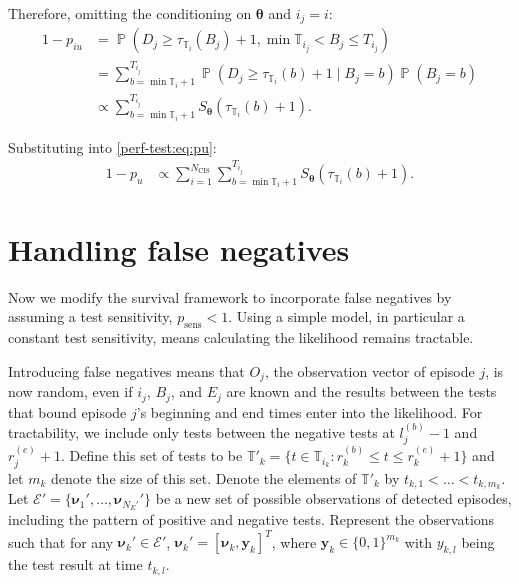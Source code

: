 \documentclass[12pt]{article}
\DeclareMathOperator{\prob}{\mathbb{P}}
\newcommand\set{\mathcal}
\renewcommand{\vec}[1]{\bm{#1}}
\newcommand{\ssep}{:}
\newcommand{\psens}{p_\text{sens}}
\newcommand{\Ncis}{N_\text{CIS}}
\newcommand{\sched}{\mathbb{T}}
\begin{document}
Therefore, omitting the conditioning on $\vec{\theta}$ and $i_j = i$:
\begin{align}
1 - p_{iu}
&= \prob(D_j \geq \tau_{\sched_{i}}(B_j)+ 1, \min \sched_{i_j} < B_j \leq T_{i_j}) \\
&= \sum_{b = \min \sched_{i} + 1}^{T_{i_j}} \prob(D_j \geq \tau_{\sched_{i}}(b) + 1 \mid B_j = b) \prob(B_j = b)\\
&\propto \sum_{b = \min \sched_{i} + 1}^{T_{i_j}} S_{\vec{\theta}}(\tau_{\sched_{i}}(b) + 1).
\label{perf-test:eq:piu}
\end{align}

Substituting into \cref{perf-test:eq:pu}:
\begin{align}
1 - p_u
& \propto \sum_{i=1}^{\Ncis} \sum_{b = \min \sched_{i} + 1}^{T_{i_j}} S_{\vec{\theta}}(\tau_{\sched_{i}}(b) + 1).
\end{align}

\section{Handling false negatives} \label{sec:false-negatives}

Now we modify the survival framework to incorporate false negatives by assuming a test sensitivity, $\psens < 1$.
Using a simple model, in particular a constant test sensitivity, means calculating the likelihood remains tractable.

Introducing false negatives means that $O_j$, the observation vector of episode $j$, is now random, even if $i_j$, $B_j$, and $E_j$ are known and the results between the tests that bound episode $j$'s beginning and end times enter into the likelihood.
For tractability, we include only tests between the negative tests at $l_j^{(b)}-1$ and $r_j^{(e)}+1$. 
Define this set of tests to be $\sched'_k = \{ t \in \sched_{i_k} \ssep r_k^{(b)} \leq t \leq r_k^{(e)} + 1 \}$ and let $m_k$ denote the size of this set.
Denote the elements of $\sched'_k$ by $t_{k,1} < \dots < t_{k,m_k}$.
Let $\set{E}' = \{ \vec{\nu}_1', \dots, \vec{\nu}_{N_E'}' \}$ be a new set of possible observations of detected episodes, including the pattern of positive and negative tests.
Represent the observations such that for any $\vec{\nu}_k' \in \set{E}'$, $\vec{\nu}_k' = [\vec{\nu}_{k}, \vec{y}_k]^T$, where $\vec{y}_k \in \{ 0, 1 \}^{m_k}$ with $y_{k,l}$ being the test result at time $t_{k,l}$.
\end{document}
